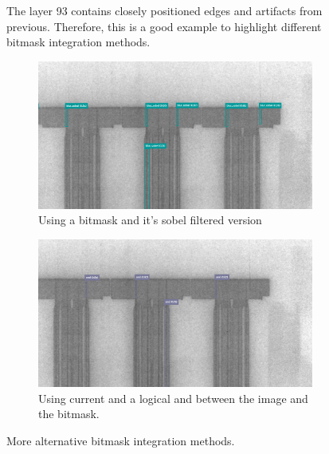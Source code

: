 \begin{figure}[!h]
\caption{The layer 93 contains closely positioned edges and artifacts from previous. Therefore, this is a good example to highlight different bitmask integration methods. }
\label{impl:layer_example}
\end{figure}

\begin{figure}[!h]
\centering

\begin{subfigure}{.9\textwidth}
  \centering
  \includegraphics[width=\linewidth]{images/implementation/results/bm/bm_sobel}
  \caption{Using a bitmask and it's sobel filtered version}
\end{subfigure}

\begin{subfigure}{.9\textwidth}
  \centering
  \includegraphics[width=\linewidth]{images/implementation/results/bm/and}
  \caption{Using current and a logical and between the image and the bitmask.}
\end{subfigure}

\caption{More alternative bitmask integration methods.}
\label{app:bm_compare_ext}
\end{figure}
